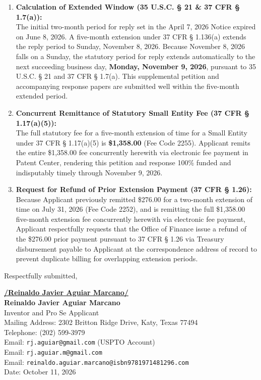 \documentclass[11pt,letterpaper]{article}
\begin{document}
\begin{enumerate}[leftmargin=*]
    \item \textbf{Calculation of Extended Window (35 U.S.C. \S{} 21 \& 37 CFR \S{} 1.7(a)):} \\
    The initial two-month period for reply set in the April 7, 2026 Notice expired on June 8, 2026. A five-month extension under 37 CFR \S{} 1.136(a) extends the reply period to Sunday, November 8, 2026. Because November 8, 2026 falls on a Sunday, the statutory period for reply extends automatically to the next succeeding business day, \textbf{Monday, November 9, 2026}, pursuant to 35 U.S.C. \S{} 21 and 37 CFR \S{} 1.7(a). This supplemental petition and accompanying response papers are submitted well within the five-month extended period.

    \item \textbf{Concurrent Remittance of Statutory Small Entity Fee (37 CFR \S{} 1.17(a)(5)):} \\
    The full statutory fee for a five-month extension of time for a Small Entity under 37 CFR \S{} 1.17(a)(5) is \textbf{\$1,358.00} (Fee Code 2255). Applicant remits the entire \$1,358.00 fee concurrently herewith via electronic fee payment in Patent Center, rendering this petition and response 100\% funded and indisputably timely through November 9, 2026.

    \item \textbf{Request for Refund of Prior Extension Payment (37 CFR \S{} 1.26):} \\
    Because Applicant previously remitted \$276.00 for a two-month extension of time on July 31, 2026 (Fee Code 2252), and is remitting the full \$1,358.00 five-month extension fee concurrently herewith via electronic fee payment, Applicant respectfully requests that the Office of Finance issue a refund of the \$276.00 prior payment pursuant to 37 CFR \S{} 1.26 via Treasury disbursement payable to Applicant at the correspondence address of record to prevent duplicate billing for overlapping extension periods.
\end{enumerate}

\vspace{0.6cm}
\begin{singlespace}
\noindent Respectfully submitted, \par\vspace{0.8cm}
\underline{\textbf{/Reinaldo Javier Aguiar Marcano/}} \\
\textbf{Reinaldo Javier Aguiar Marcano} \\
Inventor and Pro Se Applicant \\
Mailing Address: 2302 Britton Ridge Drive, Katy, Texas 77494 \\
Telephone: (202) 599-3979 \\
Email: \texttt{rj.aguiar@gmail.com} (USPTO Account) \\
Email: \texttt{rj.aguiar.m@gmail.com} \\
Email: \texttt{reinaldo.aguiar.marcano@isbn9781971481296.com} \\
Date: October 11, 2026
\end{singlespace}
\end{document}
